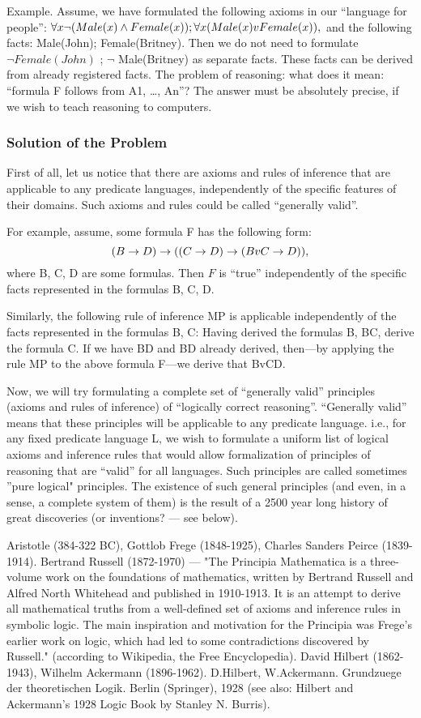 Example. Assume, we have formulated the following axioms in our ``language for people'':
\(\forall x\neg (Male(x)\wedge Female(x)); \forall x(Male(x)vFemale(x)),\) and the following facts: Male(John);
Female(Britney). Then we do not need to formulate \(\neg Female(John)\) ; \(\neg\) Male(Britney) as separate facts.
These facts can be derived from already registered facts.
The problem of reasoning: what does it mean: ``formula F follows from A1, \ldots , An''? The answer must be
absolutely precise, if we wish to teach reasoning to computers.

\subsubsection*{Solution of the Problem}

First of all, let us notice that there are axioms and rules of inference that are applicable to any predicate
languages, independently of the specific features of their domains. Such axioms and rules could be called
``generally valid''.

For example, assume, some formula F has the following form:
\[
(B\rightarrow D)\rightarrow ((C\rightarrow D)\rightarrow (BvC\rightarrow D)),
\]
where B, C, D are some formulas.
Then \(F\) is ``true'' independently of the specific facts represented in the formulas B, C, D.

Similarly, the following rule of inference MP is applicable independently of the facts represented in the
formulas B, C:
Having derived the formulas B, B\IMPLIES C, derive the formula C.
If we have B\IMPLIES D and B\IMPLIES D already derived, then---by applying the rule MP to the above formula F---we derive that BvC\IMPLIES D.

Now, we will try formulating a complete set of ``generally valid'' principles (axioms and rules of inference) of ``logically correct reasoning''. ``Generally valid'' means that these principles will be applicable to any predicate language. i.e., for any fixed predicate language L, we wish to formulate a uniform list of logical axioms and inference rules that would allow formalization of principles of reasoning that are ``valid'' for all languages. Such principles are called sometimes ''pure logical" principles. The existence of such general principles (and even, in a sense, a complete system of them) is the result of a 2500 year long history of great discoveries (or inventions? --- see below).

Aristotle (384-322 BC), Gottlob Frege (1848-1925), Charles Sanders Peirce (1839-1914).
Bertrand Russell (1872-1970) --- "The Principia Mathematica is a three-volume work on the foundations of mathematics,
written by Bertrand Russell and Alfred North Whitehead and published in 1910-1913. It is an attempt to derive all
mathematical truths from a well-defined set of axioms and inference rules in symbolic logic. The main inspiration and
motivation for the Principia was Frege's earlier work on logic, which had led to some contradictions discovered by Russell."
(according to Wikipedia, the Free Encyclopedia).
David Hilbert (1862-1943), Wilhelm Ackermann (1896-1962).
D.Hilbert, W.Ackermann. Grundzuege der theoretischen Logik. Berlin (Springer), 1928 (see also: Hilbert and Ackermann's
1928 Logic Book by Stanley N. Burris).

